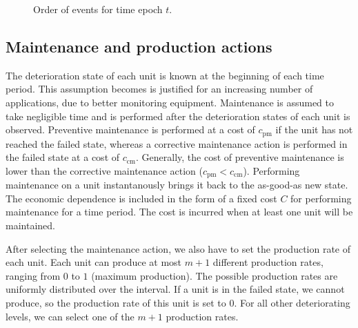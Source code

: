 \documentclass[a4paper,12pt]{article}
\begin{document}
\begin{figure}[H]
	\centering
	\caption{Order of events for time epoch $t$.}
\end{figure}

\subsection{Maintenance and production actions}
The deterioration state of each unit is known at the beginning of each time period. This assumption becomes is justified for an increasing number of applications, due to better monitoring equipment. Maintenance is assumed to take negligible time and is performed after the deterioration states of each unit is observed. Preventive maintenance is performed at a cost of $c_\text{pm}$ if the unit has not reached the failed state, whereas a corrective maintenance action is performed in the failed state at a cost of $c_\text{cm}$. Generally, the cost of preventive maintenance is lower than the corrective maintenance action ($c_\text{pm} < c_\text{cm}$). Performing maintenance on a unit instantanously brings it back to the as-good-as new state. The economic dependence is included in the form of a fixed cost $C$ for performing maintenance for a time period. The cost is incurred when at least one unit will be maintained.

After selecting the maintenance action, we also have to set the production rate of each unit. Each unit can produce at most $m+1$ different production rates, ranging from $0$ to $1$ (maximum production). The possible production rates are uniformly distributed over the interval. If a unit is in the failed state, we cannot produce, so the production rate of this unit is set to $0$. For all other deteriorating levels, we can select one of the $m+1$ production rates.
\end{document}

